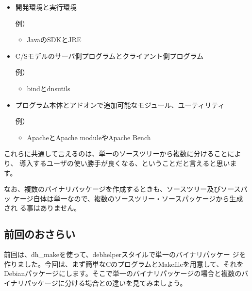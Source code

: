 \documentclass[mingoth,a4paper]{jsarticle}
\begin{document}
\begin{itemize}
 \item
開発環境と実行環境

例）
      \begin{itemize}
       \item
	    JavaのSDKとJRE

      \end{itemize}
 \item
C/Sモデルのサーバ側プログラムとクライアント側プログラム

例）
      \begin{itemize}
       \item
	    bindとdnsutils
      \end{itemize}

 \item
プログラム本体とアドオンで追加可能なモジュール、ユーティリティ

例）
      \begin{itemize}
       \item
	    ApacheとApache moduleやApache Bench
      \end{itemize}
\end{itemize}

これらに共通して言えるのは、単一のソースツリーから複数に分けることにより、
導入するユーザの使い勝手が良くなる、ということだと言えると思います。

なお、複数のバイナリパッケージを作成するときも、ソースツリー及びソースパッ
ケージ自体は単一なので、複数のソースツリー・ソースパッケージから生成され
る事はありません。

\subsection{前回のおさらい}

前回は、dh\_makeを使って、debhelperスタイルで単一のバイナリパッケー
ジを作りました。今回は、まず簡単なCのプログラムとMakefileを用意して、それを
Debianパッケージにします。そこで単一のバイナリパッケージの場合と複数のバ
イナリパッケージに分ける場合との違いを見てみましょう。
\end{document}
